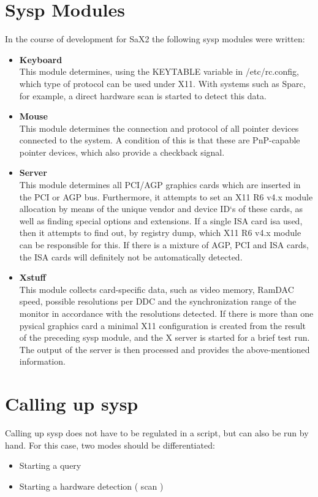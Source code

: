 \section{Sysp Modules}
In the course of development for SaX2 the following sysp modules were written:
\begin{itemize}
\item \textbf{Keyboard}\\
      This module determines, using the KEYTABLE variable in 
      /etc/rc.config, which type of protocol can be used under X11. With
      systems such as Sparc, for example, a direct hardware scan is started to
      detect this data. 
\item \textbf{Mouse}\\
      This module determines the connection and protocol of all pointer
      devices connected to the system. A condition of this is that these are
      PnP-capable pointer devices, which also provide a checkback signal.
\item \textbf{Server}\\
      This module determines all PCI/AGP graphics cards which are inserted in
      the PCI or AGP bus. Furthermore, it attempts to set an X11 R6 v4.x
      module allocation by means of the unique vendor and device ID`s of these
      cards, as well as finding special options and extensions. If a single
      ISA card isa used, then it attempts to find out, by registry dump, which
      X11 R6 v4.x module can be responsible for this. If there is a mixture of
      AGP, PCI and ISA cards, the ISA cards will definitely not be
      automatically detected.
\item \textbf{Xstuff}\\
      This module collects card-specific data, such as video memory, RamDAC
      speed, possible resolutions per DDC and the synchronization range of the
      monitor in accordance with the resolutions detected. If there is more
	  than one pysical graphics card a minimal X11 configuration is created
      from the result of the preceding sysp module, and the X server is
      started for a brief test run. The output of the server is then
      processed and provides the above-mentioned information.
\end{itemize}

\section{Calling up sysp}
Calling up sysp does not have to be regulated in a script, but can also be run
by hand. For this case, two modes should be differentiated:
\begin{itemize}
\item Starting a query
\item Starting a hardware detection ( scan )
\end{itemize}

